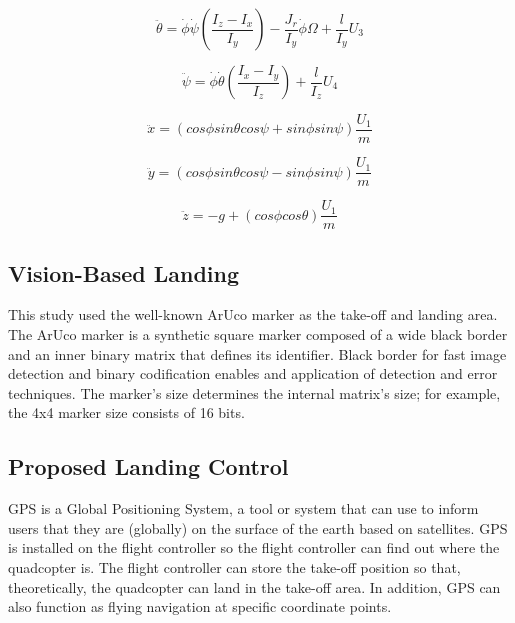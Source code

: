 \documentclass[a4paper]{jpconf}
\begin{document}
\begin{equation}
    \ddot{\theta}=\dot{\phi}\dot{\psi}\left ( \frac{I_{z}-I_{x}}{I_{y}} \right )-\frac{J_{r}}{I_{y}}\dot{\phi}\Omega+\frac{l}{I_{y}}U_{3}
\end{equation}

\begin{equation}
    \ddot{\psi}=\dot{\phi}\dot{\theta}\left ( \frac{I_{x}-I_{y}}{I_{z}} \right )+\frac{l}{I_{z}}U_{4}
\end{equation}

\begin{equation}
    \ddot{x}=(cos\phi sin\theta cos\psi + sin\phi sin\psi)\frac{U_{1}}{m}
\end{equation}

\begin{equation}
    \ddot{y}=(cos\phi sin\theta cos\psi - sin\phi sin\psi)\frac{U_{1}}{m}
\end{equation}

\begin{equation}
    \ddot{z}=-g+(cos\phi cos\theta)\frac{U_{1}}{m}
\end{equation}

\subsection{Vision-Based Landing}
This study used the well-known ArUco marker as the take-off and landing area. The ArUco marker is a synthetic square marker composed of a wide black border and an inner binary matrix that defines its identifier. Black border for fast image detection and binary codification enables and application of detection and error techniques. The marker's size determines the internal matrix's size; for example, the 4x4 marker size consists of 16 bits.


\subsection{Proposed Landing Control}
GPS is a Global Positioning System, a tool or system that can use to inform users that they are (globally) on the surface of the earth based on satellites. GPS is installed on the flight controller so the flight controller can find out where the quadcopter is. The flight controller can store the take-off position so that, theoretically, the quadcopter can land in the take-off area. In addition, GPS can also function as flying navigation at specific coordinate points.
\end{document}
